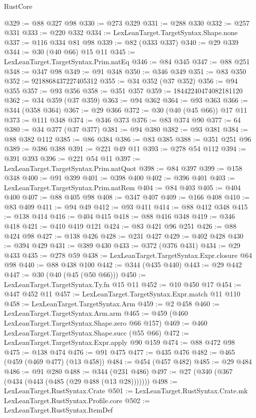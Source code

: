 \begin{lexlean}{RustCore}
\begin{coremodule}
@329 := @88 @327 @98
@330 := @273 @329
@331 := @288 @330
@332 := @257 @331
@333 := @220 @332
@334 := LexLeanTarget.TargetSyntax.Shape.none
@337 := @116 @334 @81 @98
@339 := @82 (@333 @337)
@340 := @29 @339
@344 := @30 (@40 @66) @15 @11
@345 := LexLeanTarget.TargetSyntax.Prim.natEq
@346 := @84 @345
@347 := @88 @251
@348 := @347 @98
@349 := @91 @348
@350 := @346 @349
@351 := @83 @350
@352 := 9218868437227405312
@355 := @34 @352 (@37 @352)
@356 := @94 @355
@357 := @93 @356
@358 := @351 @357
@359 := 18442240474082181120
@362 := @34 @359 (@37 @359)
@363 := @94 @362
@364 := @93 @363
@366 := @344 (@358 @364)
@367 := @29 @366
@372 := @30 (@40 (@45 @66)) @17 @11
@373 := @111 @348
@374 := @346 @373
@376 := @83 @374 @90
@377 := 64
@380 := @34 @377 (@37 @377)
@381 := @94 @380
@382 := @93 @381
@384 := @88 @382 @112
@385 := @86 @384
@386 := @83 @385
@388 := @351 @251 @96
@389 := @386 @388
@391 := @221 @49 @11
@393 := @278 @54 @112
@394 := @391 @393
@396 := @221 @54 @11
@397 := LexLeanTarget.TargetSyntax.Prim.natQuot
@398 := @84 @397
@399 := @158 @348
@400 := @91 @399
@401 := @398 @400
@402 := @396 @401
@403 := LexLeanTarget.TargetSyntax.Prim.natRem
@404 := @84 @403
@405 := @404 @400
@407 := @88 @405 @98
@408 := @347 @407
@409 := @166 @408
@410 := @83 @409
@411 := @94 @49
@412 := @93 @411
@414 := @88 @412 @348
@415 := @138 @414
@416 := @404 @415
@418 := @88 @416 @348
@419 := @346 @418
@421 := @410 @419 @121
@424 := @83 @421 @96 @251
@426 := @88 @424 @98
@427 := @138 @426
@428 := @231 @427
@429 := @402 @428
@430 := @394 @429
@431 := @389 @430
@433 := @372 (@376 @431)
@434 := @29 @433
@435 := @278 @59
@438 := LexLeanTarget.TargetSyntax.Expr.closure @64 @98
@440 := @88 @438 @100
@442 := @344 (@435 @440)
@443 := @29 @442
@447 := @30 (@40 (@45 (@50 @66)))
@450 := LexLeanTarget.TargetSyntax.Ty.fn @15 @11
@452 := @10 @450 @17
@454 := @447 @452 @11
@457 := LexLeanTarget.TargetSyntax.Expr.match @11 @110
@458 := LexLeanTarget.TargetSyntax.Arm
@459 := @2 @458
@460 := LexLeanTarget.TargetSyntax.Arm.arm
@465 := @459 (@460 LexLeanTarget.TargetSyntax.Shape.zero @66 @157)
@469 := @460 LexLeanTarget.TargetSyntax.Shape.succ (@55 @66)
@472 := LexLeanTarget.TargetSyntax.Expr.apply @90 @159
@474 := @88 @472 @98
@475 := @138 @474
@476 := @91 @475
@477 := @435 @476
@482 := @465 (@459 (@469 @477) (@13 @458))
@484 := @454 (@457 @482)
@485 := @29 @484
@486 := @91 @280
@488 := @344 (@231 @486)
@497 := @27 (@340 (@367 (@434 (@443 (@485 (@29 @488 (@13 @28)))))))
@498 := LexLeanTarget.RustSyntax.Crate
@501 := LexLeanTarget.RustSyntax.Crate.mk LexLeanTarget.RustSyntax.Profile.core
@502 := LexLeanTarget.RustSyntax.ItemDef

\end{coremodule}
\end{lexlean}
